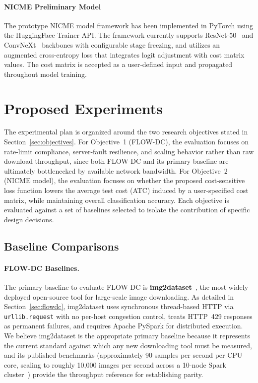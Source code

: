 \documentclass[11pt, letterpaper]{article}
\begin{document}
\paragraph{NICME Preliminary Model}
The prototype NICME model framework has been implemented in PyTorch using the HuggingFace
Trainer API. The framework currently supports ResNet-50~\cite{he2016resnet} and
ConvNeXt~\cite{liu2022convnext} backbones with configurable stage freezing, and
utilizes an augmented cross-entropy loss that integrates logit adjustment with cost matrix values. The
cost matrix is accepted as a user-defined input and propagated throughout model training.

\section{Proposed Experiments}
\label{sec:experiments}

The experimental plan is organized around the two research objectives stated in
Section~\ref{sec:objectives}. For Objective~1 (FLOW-DC), the evaluation
focuses on rate-limit compliance, server-fault resilience, and scaling behavior rather than raw download
throughput, since both FLOW-DC and its primary baseline are ultimately
bottlenecked by available network bandwidth. For Objective~2 (NICME model), the
evaluation focuses on whether the proposed cost-sensitive loss function lowers
the average test cost (ATC) induced by a user-specified cost matrix, while
maintaining overall classification accuracy. Each objective is evaluated against a set of
baselines selected to isolate the contribution of specific design decisions.

\subsection{Baseline Comparisons}
\label{sec:baselines}

\paragraph{FLOW-DC Baselines.}
The primary baseline to evaluate FLOW-DC is \textbf{img2dataset}~\cite{beaumont_img2dataset}, the
most widely deployed open-source tool for large-scale image downloading. As
detailed in Section~\ref{sec:flowdc}, img2dataset uses synchronous thread-based
HTTP via \texttt{urllib.request} with no per-host congestion control, treats
HTTP~429 responses as permanent failures, and requires Apache PySpark for
distributed execution. We believe img2dataset is the appropriate primary baseline because
it represents the current standard against which any new downloading tool must
be measured, and its published benchmarks (approximately 90 samples per second
per CPU core, scaling to roughly 10,000 images per second across a 10-node
Spark cluster~\cite{schuhmann2022laion5b}) provide the throughput reference
for establishing parity.
\end{document}
